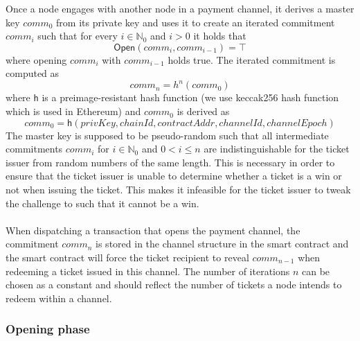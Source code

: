 Once a node engages with another node in a payment channel, it derives a master key $comm_0$ from its private key and uses it to create an iterated commitment $comm_i$ such that for every $i \in \mathbb{N}_0$ and $i > 0$ it holds that $$ \mathsf{Open}(comm_{i}, comm_{i-1}) = \top $$
where opening $comm_{i}$ with $comm_{i-1}$ holds true.
The iterated commitment is computed as $$comm_n = h^n(comm_0)$$ where $\mathsf{h}$ is a preimage-resistant hash function (we use keccak256 hash function which is used in Ethereum) and $comm_0$ is derived as 
$$ comm_0 = \mathsf{h}(privKey, chainId, contractAddr, channelId, channelEpoch)$$
The master key is supposed to be pseudo-random such that all intermediate commitments $comm_{i}$ for $i \in \mathbb{N}_0$ and $0 < i \le n$ are indistinguishable for the ticket issuer from random numbers of the same length. This is necessary in order to ensure that the ticket issuer is unable to determine whether a ticket is a win or not when issuing the ticket. This makes it infeasible for the ticket issuer to tweak the challenge to such that it cannot be a win.
\\~\\When dispatching a transaction that opens the payment channel, the commitment $comm_n$ is stored in the channel structure in the smart contract and the smart contract will force the ticket recipient to reveal $comm_{n-1}$ when redeeming a ticket issued in this channel.
The number of iterations $n$ can be chosen as a constant and should reflect the number of tickets a node intends to redeem within a channel.

\subsubsection{Opening phase}

